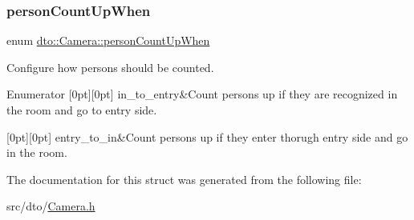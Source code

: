 \subsubsection{\texorpdfstring{person\+Count\+Up\+When}{personCountUpWhen}}
{\footnotesize\ttfamily enum \mbox{\hyperlink{structdto_1_1_camera_a737146d299fc52d1303ef07858ed2641}{dto\+::\+Camera\+::person\+Count\+Up\+When}}}



Configure how persons should be counted. 

\begin{DoxyEnumFields}{Enumerator}
[0pt][0pt]{}\mbox{\label{structdto_1_1_camera_a737146d299fc52d1303ef07858ed2641a474954d0f22a02d51c02901a277e7e3d}} 
in\+\_\+to\+\_\+entry&Count persons up if they are recognized in the room and go to entry side. \\
\hline

[0pt][0pt]{}\mbox{\label{structdto_1_1_camera_a737146d299fc52d1303ef07858ed2641a42305ff776f56ef9aae4e62b3df5b9e4}} 
entry\+\_\+to\+\_\+in&Count persons up if they enter thorugh entry side and go in the room. \\
\hline

\end{DoxyEnumFields}


The documentation for this struct was generated from the following file\+:\begin{DoxyCompactItemize}
\item 
src/dto/\mbox{\hyperlink{_camera_8h}{Camera.\+h}}\end{DoxyCompactItemize}
